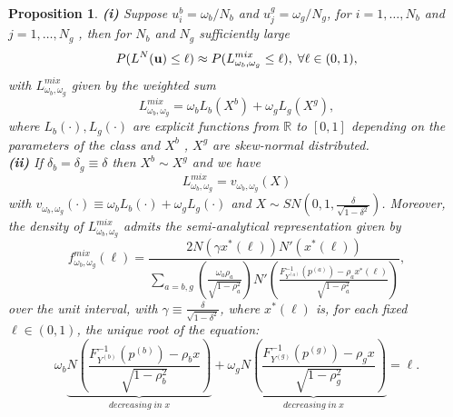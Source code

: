 \documentclass[preprint,12pt]{article}
\newtheorem{Proposition}[Theorem]{Proposition}
\begin{document}
\begin{Proposition}\label{Limit-distrib}
 {\bf{(i)}} Suppose $u^b_i = \omega_b/N_b$  and $u^g_j = \omega_g/N_g$, for $i=1,\ldots,N_b$ and $j=1,\ldots,N_g$ , then for $N_b$ and $N_g $ sufficiently large
$$
P(L^N({\bf{u}})\leq \ell) \approx P(L^{mix}_{\omega_b,\omega_g}\leq \ell),\; \forall \ell\in (0,1),
$$
with $L^{mix}_{\omega_b,\omega_g}$ given by the weighted sum
\begin{equation} \label{asymp1}
L^{mix}_{\omega_b,\omega_g}=\omega_bL_b(X^b)+\omega_gL_g(X^g),
\end{equation}
where $L_b(\cdot),L_g(\cdot)$ are explicit functions from $\mathbb{R}$ to $[0,1]$ depending on the parameters of the class and $X^b$ , $X^g$ are skew-normal distributed.\\
 {\bf{(ii)}} If $\delta_b=\delta_g\equiv \delta$ then $X^b\sim X^g$ and we have 
\begin{equation} \label{asymp2}
 L^{mix}_{\omega_b,\omega_g}=v_{\omega_b,\omega_g}(X)
\end{equation}
 with $v_{\omega_b,\omega_g}(\cdot)\equiv \omega_bL_b(\cdot)+\omega_gL_g(\cdot)$ and $X\sim SN(0,1,\frac{\delta}{\sqrt{1-\delta^2}})$. Moreover, the  density of $ L^{mix}_{\omega_b,\omega_g}$ admits the semi-analytical representation given by
\begin{equation}\label{dens}
f^{mix}_{\omega_b,\omega_g}(\ell) =\frac{2 N(\gamma x^*(\ell)) N'(x^*(\ell))}{ \sum_{a = b,g}\left(\frac{\omega_a\rho_a}{\sqrt{1-\rho_a^2}}\right)N'\left(\frac{F_{Y^{(a)}}^{-1}(p^{(a)})-\rho_a x^*(\ell)}{\sqrt{1-\rho_a^2}} \right) },
\end{equation}
over the unit interval, with $\gamma \equiv \frac{\delta}{\sqrt{1-\delta^2}}$, where $x^*(\ell)$ is, for each fixed $\ell \in (0,1)$, the unique root of the equation:
$$
\omega_b\!\underbrace{N\left(\frac{F_{Y^{(b)}}^{-1}(p^{(b)}) - \rho_b x} {\sqrt{1-\rho_b^2}}\right)}_{decreasing \;in\; x}\!\!+\omega_g\!\underbrace{N\left(\frac{F_{Y^{(g)}}^{-1}(p^{(g)}) - \rho_g x} {\sqrt{1-\rho_g^2}}\right)}_{decreasing \;in\; x}\!=\ell.
$$
\end{Proposition}
\end{document}
